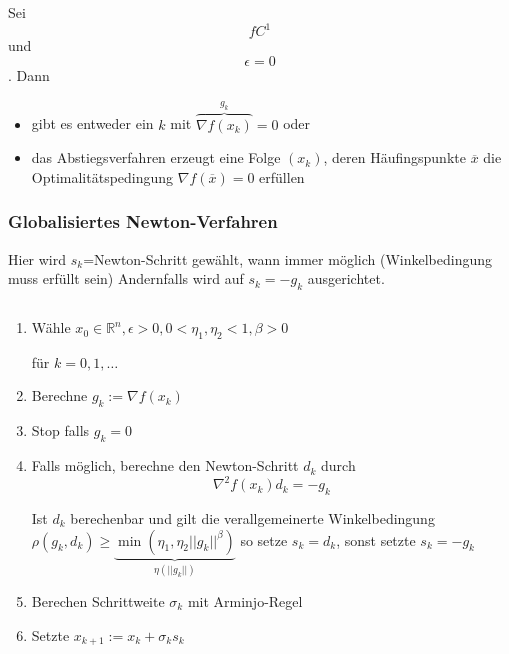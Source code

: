\documentclass[10pt,a4paper]{article}
\begin{document}
\begin{satz}


Sei $$f C^{1}$$ und $$\epsilon=0$$. Dann 

\begin{itemize}
\item gibt es entweder ein $k$ mit $\overbrace{\nabla f(x_k)}^{g_k}=0$ oder
\item das Abstiegsverfahren erzeugt eine Folge $(x_k)$, deren Häufingspunkte $\overline{x}$ die Optimalitätspedingung $\nabla f(\overline{x})=0$ erfüllen
\end{itemize}

\end{satz}

\subsubsection{Globalisiertes Newton-Verfahren}
Hier wird $s_k$=Newton-Schritt gewählt, wann immer möglich (Winkelbedingung muss erfüllt sein) Andernfalls wird auf $s_k=-g_k$ ausgerichtet.



\begin{bsp}

$$ $$

\begin{enumerate}
\item Wähle $x_0 \in \mathbb{R}^{n}, \epsilon > 0 , 0 < \eta_1 , \eta_2 < 1, \beta>0$

für $k=0,1,\ldots$

\item Berechne $g_k := \nabla f(x_k)$

\item Stop falls $g_k =0$
\item Falls möglich, berechne den Newton-Schritt $d_k$ durch $$\nabla^{2} f(x_k) d_k = -g_k$$

Ist $d_k$ berechenbar und gilt die verallgemeinerte Winkelbedingung $\rho(g_k,d_k) \geq \underbrace{\min(\eta_1,\eta_2 ||g_k||^{\beta})}_{\eta(||g_k||)}$  so setze $s_k=d_k$, sonst setzte $s_k=-g_k$

\item Berechen Schrittweite $\sigma_k$ mit Arminjo-Regel

\item Setzte $x_{k+1}:=x_k+\sigma_k s_k$
\end{enumerate}


\end{bsp}
\end{document}
